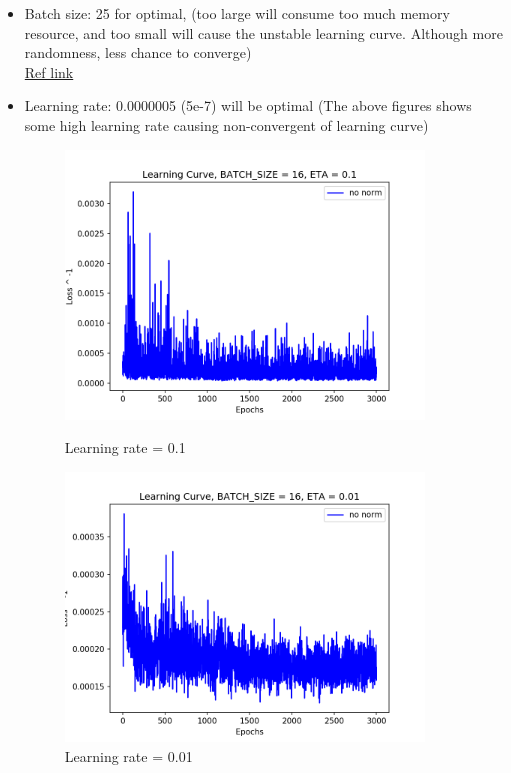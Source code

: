 \documentclass[11pt, a4paper]{article} %
\begin{document}
\begin{itemize}
    \item Batch size: 25 for optimal, (too large will consume too much memory resource, and too small will cause the unstable learning curve. Although more randomness, less chance to converge)
    \\ \href{https://www.zhihu.com/question/32673260}{Ref link}
    \item Learning rate: 0.0000005 (5e-7) will be optimal (The above figures shows some high learning rate causing non-convergent of learning curve) 
    \begin{figure}
        \centering
        \begin{minipage}{0.5\textwidth}
            \centering
            \includegraphics[width=0.9\textwidth]{figure/01_LC.png} %
            \caption{Learning rate = 0.1}
        \end{minipage}\hfill
        \begin{minipage}{0.5\textwidth}
            \centering
            \includegraphics[width=0.9\textwidth]{figure/001_LC.png} %
            \caption{Learning rate = 0.01}
        \end{minipage}
    \end{figure}
\end{itemize}
\end{document}
